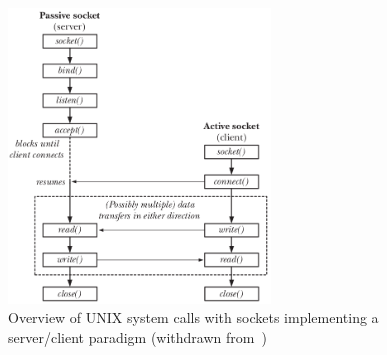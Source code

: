 \begin{figure}[!hbt]
\centering
    \includegraphics[width=0.62\textwidth]{./img/cli-serv-operation.png}
  \caption{Overview of UNIX system calls with sockets implementing 
a server/client paradigm (withdrawn from~\cite{kerrisk2010linux})}%
\label{fig:cli-serv-operation}
\end{figure}

